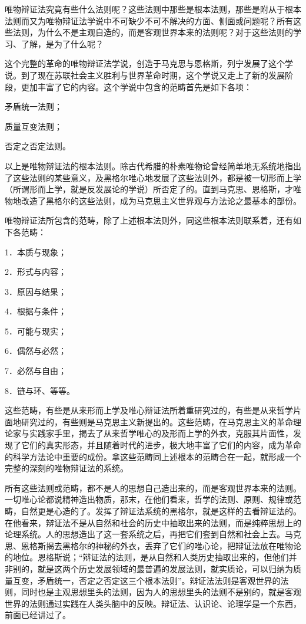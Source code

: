 唯物辩证法究竟有些什么法则呢？这些法则中那些是根本法则，那些是附从于根本法则而又为唯物辩证法学说中不可缺少不可不解决的方面、侧面或问题呢？所有这些法则，为什么不是主观自造的，而是客观世界本来的法则呢？对于这些法则的学习、了解，是为了什么呢？

这个完整的革命的唯物辩证法学说，创造于马克思与恩格斯，列宁发展了这个学说。到了现在苏联社会主义胜利与世界革命时期，这个学说又走上了新的发展阶段，更加丰富了它的内容。这个学说中包含的范畴首先是如下各项：

矛盾统一法则；

质量互变法则；

否定之否定法则。

以上是唯物辩证法的根本法则。除古代希腊的朴素唯物论曾经简单地无系统地指出了这些法则的某些意义，及黑格尔唯心地发展了这些法则外，都是被一切形而上学（所谓形而上学，就是反发展论的学说）所否定了的。直到马克思、恩格斯，才唯物地改造了黑格尔的这些法则，成为马克思主义世界观与方法论之最基本的部份。

唯物辩证法所包含的范畴，除了上述根本法则外，同这些根本法则联系着，还有如下各范畴：

1．本质与现象；

2．形式与内容；

3．原因与结果；

4．根据与条件；

5．可能与现实；

6．偶然与必然；

7．必然与自由；

8．链与环、等等。

这些范畴，有些是从来形而上学及唯心辩证法所着重研究过的，有些是从来哲学片面地研究过的，有些则是马克思主义新提出的。这些范畴，在马克思主义的革命理论家与实践家手里，揭去了从来哲学唯心的及形而上学的外衣，克服其片面性，发现了它们的真实形态，并且随着时代的进步，极大地丰富了它们的内容，成为革命的科学方法论中重要的成份。拿这些范畴同上述根本的范畴合在一起，就形成一个完整的深刻的唯物辩证法的系统。

所有这些法则或范畴，都不是人的思想自己造出来的，而是客观世界本来的法则。一切唯心论都说精神造出物质，那末，在他们看来，哲学的法则、原则、规律或范畴，自然更是心造的了。发挥了辩证法系统的黑格尔，就是这样的去看辩证法的。在他看来，辩证法不是从自然和社会的历史中抽取出来的法则，而是纯粹思想上的论理系统。人的思想造出了这一套系统之后，再把它们套到自然和社会上去。马克思、恩格斯揭去黑格尔的神秘的外衣，丢弃了它们的唯心论，把辩证法放在唯物论的地位。恩格斯说；“辩证法的法则，是从自然和人类历史抽取出来的，但他们并非别的，就是这两个历史发展领域的最普遍的发展法则，就实质论，可以归纳为质量互变，矛盾统一，否定之否定这三个根本法则”。辩证法法则是客观世界的法则，同时也是主观思想里头的法则，因为人的思想里头的法则不是别的，就是客观世界的法则通过实践在人类头脑中的反映。辩证法、认识论、论理学是一个东西，前面已经讲过了。

